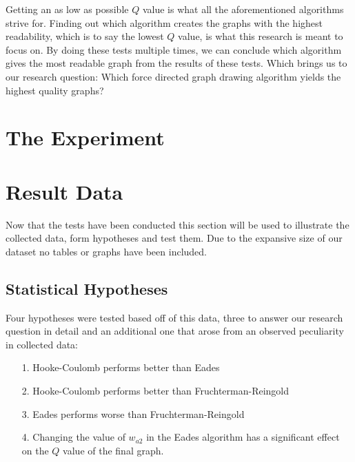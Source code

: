 \documentclass[a4paper,12pt]{article}
\begin{document}
    Getting an as low as possible $Q$ value is what all the aforementioned algorithms strive for.
    Finding out which algorithm creates the graphs with the highest readability, which is to say the lowest $Q$ value, is what this research is meant to focus on.
    By doing these tests multiple times, we can conclude which algorithm gives the most readable graph from the results of these tests.
    Which brings us to our research question: Which force directed graph drawing algorithm yields the highest quality graphs?

  \section{The Experiment} %

  \section{Result Data} %
  Now that the tests have been conducted this section will be used to illustrate the collected data, form hypotheses and test them. Due to the expansive size of our dataset no tables or graphs have been included.
  
  \subsection{Statistical Hypotheses}
  Four hypotheses were tested based off of this data, three to answer our research question in detail and an additional one that arose from an observed peculiarity in collected data:
  \begin{itemize}
  	\item[1.] Hooke-Coulomb performs better than Eades
  	\item[2.] Hooke-Coulomb performs better than Fruchterman-Reingold
  	\item[3.] Eades performs worse than Fruchterman-Reingold
  	\item[4.] Changing the value of $w_{a2}$ in the Eades algorithm has a significant effect on the $Q$ value of the final graph.
  \end{itemize}
  
\end{document}
